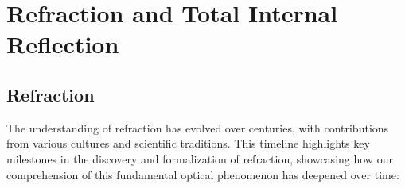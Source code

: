 \documentclass[
  a4paper,
]{book}
\begin{document}
\chapter{Refraction and Total Internal
Reflection}\label{refraction-and-total-internal-reflection}

\section{Refraction}\label{refraction}

\begin{tcolorbox}[enhanced jigsaw, breakable, toptitle=1mm, bottomrule=.15mm, colbacktitle=quarto-callout-note-color!10!white, title=\textcolor{quarto-callout-note-color}{\faInfo}\hspace{0.5em}{Historical Context of Refraction}, arc=.35mm, rightrule=.15mm, bottomtitle=1mm, opacityback=0, toprule=.15mm, coltitle=black, leftrule=.75mm, opacitybacktitle=0.6, colback=white, left=2mm, titlerule=0mm, colframe=quarto-callout-note-color-frame]

The understanding of refraction has evolved over centuries, with
contributions from various cultures and scientific traditions. This
timeline highlights key milestones in the discovery and formalization of
refraction, showcasing how our comprehension of this fundamental optical
phenomenon has deepened over time:


\end{tcolorbox}
\end{document}
